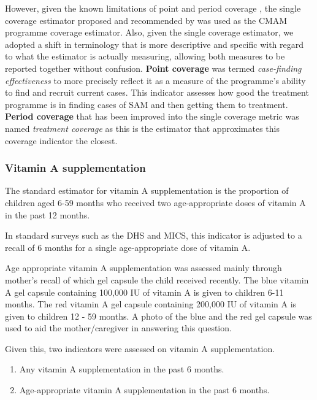 \documentclass[12pt,a4paper]{article}
\begin{document}
However, given the known limitations of point and period coverage \citep{Myatt:2012tt}, the single coverage estimator proposed and recommended by \citet{Balegamire:2015ud} was used as the CMAM programme coverage estimator. Also, given the single coverage estimator, we adopted a shift in terminology that is more descriptive and specific with regard to what the estimator is actually measuring, allowing both measures to be reported together without confusion. \textbf{Point coverage} was termed \emph{case-finding effectiveness} to more precisely reflect it as a measure of the programme's ability to find and recruit current cases. This indicator assesses how good the treatment programme is in finding cases of SAM and then getting them to treatment. \textbf{Period coverage} that has been improved into the single coverage metric was named \emph{treatment coverage} as this is the estimator that approximates this coverage indicator the closest.

\hypertarget{vitamin-a-supplementation}{%
\subsubsection{Vitamin A supplementation}\label{vitamin-a-supplementation}}

The standard estimator for vitamin A supplementation is the proportion of children aged 6-59 months who received two age-appropriate doses of vitamin A in the past 12 months.

In standard surveys such as the DHS and MICS, this indicator is adjusted to a recall of 6 months for a single age-appropriate dose of vitamin A.

Age appropriate vitamin A supplementation was assessed mainly through mother's recall of which gel capsule the child received recently. The blue vitamin A gel capsule containing 100,000 IU of vitamin A is given to children 6-11 months. The red vitamin A gel capsule containing 200,000 IU of vitamin A is given to children 12 - 59 months. A photo of the blue and the red gel capsule was used to aid the mother/caregiver in answering this question.

Given this, two indicators were assessed on vitamin A supplementation.

\begin{enumerate}
\def\labelenumi{\arabic{enumi}.}
\item
  Any vitamin A supplementation in the past 6 months.
\item
  Age-appropriate vitamin A supplementation in the past 6 months.
\end{enumerate}
\end{document}
